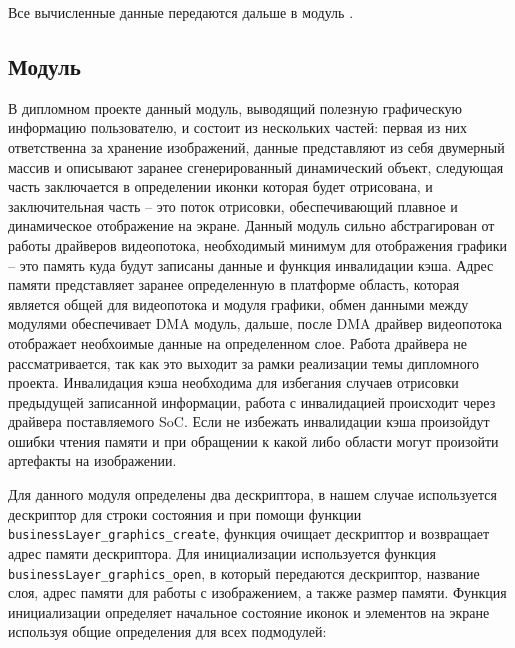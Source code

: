 Все вычисленные данные передаются дальше в модуль \moduleGraphics.

\subsection{Модуль \moduleGraphics}

В дипломном проекте данный модуль, выводящий полезную графическую информацию пользователю, и состоит из нескольких частей: первая из них ответственна за хранение
изображений, данные представляют из себя двумерный массив и описывают заранее сгенерированный динамический объект, следующая часть заключается в определении иконки
которая будет отрисована, и заключительная часть -- это поток отрисовки, обеспечивающий плавное и динамическое отображение на экране. Данный модуль
сильно абстрагирован от работы драйверов видеопотока, необходимый минимум для отображения графики -- это память куда будут записаны данные и функция инвалидации кэша.
Адрес памяти представляет заранее определенную в платформе область, которая является общей для видеопотока и модуля графики, обмен данными между модулями
обеспечивает DMA модуль, дальше, после DMA драйвер видеопотока отображает необхоимые данные на определенном слое. Работа драйвера не рассматривается, так как это выходит за рамки
реализации темы дипломного проекта. Инвалидация кэша необходима для избегания случаев отрисовки предыдущей записанной информации, работа с инвалидацией происходит через драйвера
поставляемого SoC.
Если не избежать инвалидации кэша произойдут ошибки чтения памяти и при обращении к какой либо области могут произойти артефакты на изображении.

Для данного модуля определены два дескриптора, в нашем случае используется дескриптор для строки состояния и при помощи функции \lstinline{businessLayer_graphics_create},
функция очищает дескриптор и возвращает адрес памяти дескриптора. Для инициализации используется функция \lstinline{businessLayer_graphics_open}, в который передаются дескриптор,
название слоя, адрес памяти для работы с изображением, а также размер памяти. Функция инициализации определяет начальное состояние иконок и элементов на экране используя
общие определения для всех подмодулей:

